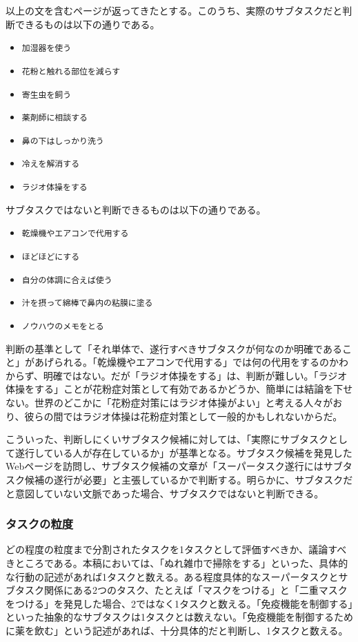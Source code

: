 \documentclass[submit,techreq]{ipsj}
\def\|{\verb|}
\begin{document}
以上の文を含むページが返ってきたとする。このうち、実際のサブタスクだと判断できるものは以下の通りである。

\begin{itemize}
\item \|加湿器を使う|
\item \|花粉と触れる部位を減らす|
\item \|寄生虫を飼う|
\item \|薬剤師に相談する|
\item \|鼻の下はしっかり洗う|
\item \|冷えを解消する|
\item \|ラジオ体操をする|
\end{itemize}


サブタスクではないと判断できるものは以下の通りである。

\begin{itemize}
\item \|乾燥機やエアコンで代用する|
\item \|ほどほどにする|
\item \|自分の体調に合えば使う|
\item \|汁を摂って綿棒で鼻内の粘膜に塗る|
\item \|ノウハウのメモをとる|
\end{itemize}


判断の基準として「それ単体で、遂行すべきサブタスクが何なのか明確であること」があげられる。「乾燥機やエアコンで代用する」では何の代用をするのかわからず、明確ではない。だが「ラジオ体操をする」は、判断が難しい。「ラジオ体操をする」ことが花粉症対策として有効であるかどうか、簡単には結論を下せない。世界のどこかに「花粉症対策にはラジオ体操がよい」と考える人々がおり、彼らの間ではラジオ体操は花粉症対策として一般的かもしれないからだ。

こういった、判断しにくいサブタスク候補に対しては、「実際にサブタスクとして遂行している人が存在しているか」が基準となる。サブタスク候補を発見したWebページを訪問し、サブタスク候補の文章が「スーパータスク遂行にはサブタスク候補の遂行が必要」と主張しているかで判断する。明らかに、サブタスクだと意図していない文脈であった場合、サブタスクではないと判断できる。

\subsubsection{タスクの粒度}
どの程度の粒度まで分割されたタスクを1タスクとして評価すべきか、議論すべきところである。本稿においては、「ぬれ雑巾で掃除をする」といった、具体的な行動の記述があれば1タスクと数える。ある程度具体的なスーパータスクとサブタスク関係にある2つのタスク、たとえば「マスクをつける」と「二重マスクをつける」を発見した場合、2ではなく1タスクと数える。「免疫機能を制御する」といった抽象的なサブタスクは1タスクとは数えない。「免疫機能を制御するために薬を飲む」という記述があれば、十分具体的だと判断し、1タスクと数える。
\end{document}
